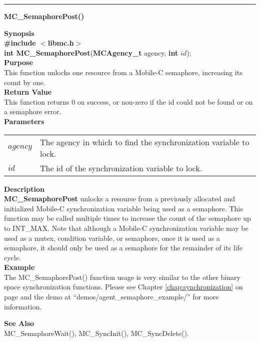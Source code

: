 \noindent
\vspace{5pt}
\rule{6.5in}{0.015in}
\noindent
{}
{\LARGE \bf MC\_SemaphorePost()}\\

\noindent
{\bf Synopsis}\\
{\bf \#include $<$libmc.h$>$}\\
{\bf int MC\_SemaphorePost}({\bf MCAgency\_t} agency, {\bf int} $id$);\\

\noindent
{\bf Purpose}\\
This function unlocks one resource from a Mobile-C semaphore, increasing its
count by one.\\

\noindent
{\bf Return Value}\\
This function returns 0 on success, or non-zero if the id could not be found 
or on a semaphore error.\\

\noindent
{\bf Parameters}
\vspace{-0.1pt}
\begin{description}
\item
\begin{tabular}{p{10 mm}p{145 mm}} 
$agency$ & The agency in which to find the synchronization variable to lock.\\
$id$ & The id of the synchronization variable to lock. 
\end{tabular}
\end{description}

\noindent
{\bf Description}\\
{\bf MC\_SemaphorePost} unlocks a resourse from a previously allocated and 
initialized Mobile-C synchronization variable being used as a semaphore. 
This function may be called multiple times to increase the count of the 
semaphore up to INT\_MAX. 
Note that although a Mobile-C synchronization variable may be used as a mutex, 
condition variable, or semaphore, once it is used as a semaphore, it should 
only be used as a semaphore for the remainder of its life cycle.\\

\noindent
{\bf Example}\\
The MC\_SemaphorePost() function usage is very similar to the other
binary space synchronization functions. Please see Chapter 
\ref{chap:synchronization} on page \pageref{chap:synchronization} 
and the demo at ``demos/agent\_semaphore\_example/'' for
more information.\\
\noindent

\noindent
{\bf See Also}\\
MC\_SemaphoreWait(), MC\_SyncInit(), MC\_SyncDelete().\\

